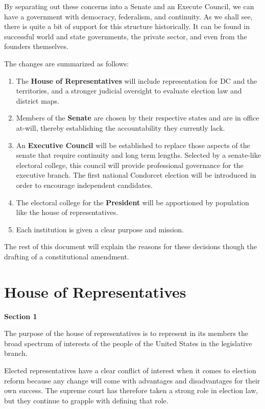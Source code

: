 \documentclass{article}
\begin{document}
By separating out these concerns into a Senate and an Execute Council, we can have a government with democracy, federalism, and continuity. As we shall see, there is quite a bit of support for this structure historically. It can be found in successful world and state governments, the private sector, and even from the founders themselves.

The changes are summarized as follows:
\begin{enumerate}
  \item The \textbf{House of Representatives} will include representation for DC and the territories, and a stronger judicial oversight to evaluate election law and district maps.
  \item Members of the \textbf{Senate} are chosen by their respective states and are in office at-will, thereby establishing the accountability they currently lack.
  \item An \textbf{Executive Council} will be established to replace those aspects of the senate that require continuity and long term lengths. Selected by a senate-like electoral college, this council will provide professional governance for the executive branch. The first national Condorcet election will be introduced in order to encourage independent candidates.
  \item The electoral college for the \textbf{President} will be apportioned by population like the house of representatives.
 \item Each institution is given a clear purpose and mission.
\end{enumerate}

The rest of this document will explain the reasons for these decisions though the drafting of a constitutional amendment.

\section{House of Representatives}

\begin{quoting}
\textbf{Section 1}

The purpose of the house of representatives is to represent in its members the broad spectrum of interests of the people of the United States in the legislative branch.
\end{quoting}

Elected representatives have a clear conflict of interest when it comes to election reform because any change will come with advantages and disadvantages for their own success. The supreme court has therefore taken a strong role in election law, but they continue to grapple with defining that role.
\end{document}

